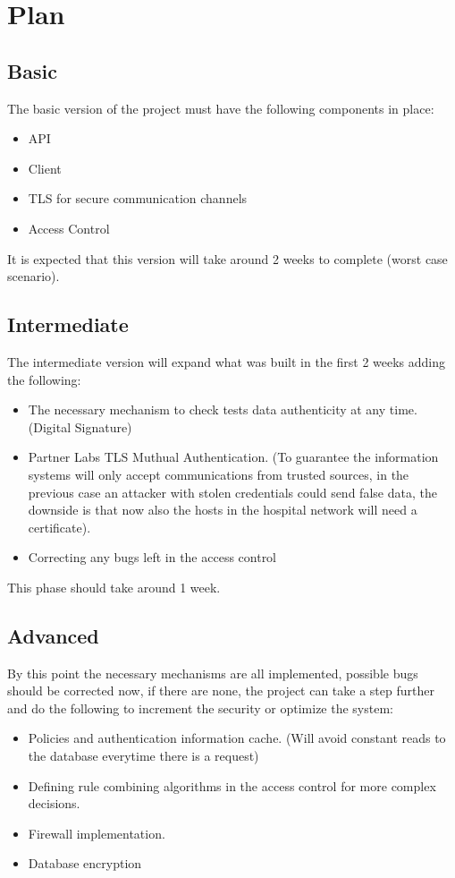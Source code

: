 \section{Plan}

\subsection{Basic}
The basic version of the project must have the following components in place:
\begin{itemize}
	\item API
	\item Client
	\item TLS for secure communication channels
	\item Access Control
\end{itemize}

It is expected that this version will take around 2 weeks to complete (worst case scenario). 


\subsection{Intermediate}
The intermediate version will expand what was built in the first 2 weeks adding the following:
\begin{itemize}
	\item The necessary mechanism to check tests data authenticity at any time. (Digital Signature)
	\item Partner Labs TLS Muthual Authentication. (To guarantee the information systems will only accept communications from trusted sources, in the previous case an attacker with stolen credentials could send false data, the downside is that now also the hosts in the hospital network will need a certificate). 
	\item Correcting any bugs left in the access control
\end{itemize}

This phase should take around 1 week.


\subsection{Advanced}

By this point the necessary mechanisms are all implemented, possible bugs should be corrected now, if there are none, the project can take a step further and do the following to increment the security or optimize the system:

\begin{itemize}
	\item Policies and authentication information cache. (Will avoid constant reads to the database everytime there is a request)
	\item Defining rule combining algorithms in the access control for  more complex decisions.
	\item Firewall implementation.
	\item Database encryption
\end{itemize}


